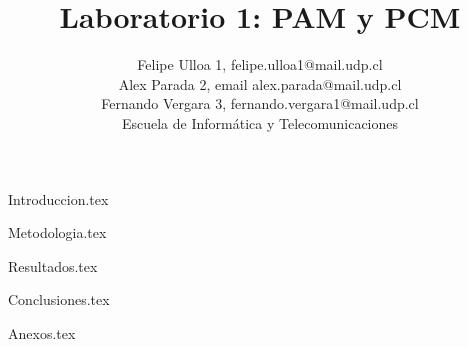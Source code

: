 \documentclass[lettersize,journal]{IEEEtran}
\begin{document}
\title{Laboratorio 1: PAM y PCM}

\author{Felipe Ulloa 1, felipe.ulloa1@mail.udp.cl \\
Alex Parada 2, email alex.parada@mail.udp.cl \\
Fernando Vergara 3, fernando.vergara1@mail.udp.cl \\

Escuela de Informática y Telecomunicaciones \\ 
}



\maketitle

{Introduccion.tex}

{Metodologia.tex}

{Resultados.tex}

{Conclusiones.tex}

\onecolumn
{Anexos.tex}



\nocite{IEEEhowto:kopka}

\end{document}
